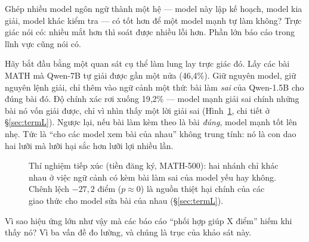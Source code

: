 \documentclass[12pt,a4paper]{article}
\begin{document}
Ghép nhiều model ngôn ngữ thành một hệ --- model này lập kế hoạch, model kia giải, model khác
kiểm tra --- có tốt hơn để một model mạnh tự làm không? Trực giác nói có: nhiều mắt hơn thì
soát được nhiều lỗi hơn. Phần lớn báo cáo trong lĩnh vực cũng nói có.

Hãy bắt đầu bằng một quan sát cụ thể làm lung lay trực giác đó. Lấy các bài MATH mà Qwen-7B tự
giải được gần một nửa (46,4\%). Giữ nguyên model, giữ nguyên lệnh giải, chỉ thêm vào ngữ cảnh
một thứ: bài làm \emph{sai} của Qwen-1.5B cho đúng bài đó. Độ chính xác rơi xuống 19,2\% ---
model mạnh giải sai chính những bài nó vốn giải được, chỉ vì nhìn thấy một lời giải sai
(Hình~\ref{fig:exposure}, chi tiết ở \S\ref{sec:termL}). Ngược lại, nếu bài làm kèm theo là bài
\emph{đúng}, model mạnh tốt lên nhẹ. Tức là ``cho các model xem bài của nhau'' không trung tính:
nó là con dao hai lưỡi mà lưỡi hại sắc hơn lưỡi lợi nhiều lần.

\begin{figure}[t]\centering
{}
\caption{Thí nghiệm tiếp xúc (tiền đăng ký, MATH-500): hai nhánh chỉ khác nhau ở việc ngữ cảnh
có kèm bài làm sai của model yếu hay không. Chênh lệch $-27{,}2$ điểm ($p \approx 0$) là nguồn
thiệt hại chính của các giao thức cho model sửa bài của nhau (\S\ref{sec:termL}).}
\label{fig:exposure}
\end{figure}

Vì sao hiệu ứng lớn như vậy mà các báo cáo ``phối hợp giúp X điểm'' hiếm khi thấy nó? Vì ba
vấn đề đo lường, và chúng là trục của khảo sát này.
\end{document}
